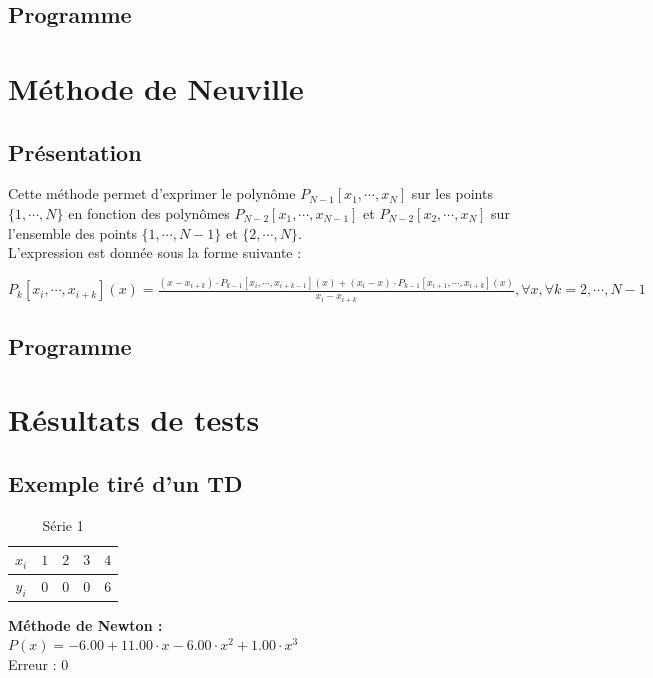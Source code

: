 \documentclass{report}
\begin{document}
      \subsection{Programme}
	
    \newpage
    \section{Méthode de Neuville}
      \subsection{Présentation}
	Cette méthode permet d'exprimer le polynôme $P_{N-1}[x_{1},\cdots,x_{N}]$ sur les points $\{1,\cdots,N\}$ en fonction des polynômes $P_{N-2}[x_{1},\cdots,x_{N-1}]$ et $P_{N-2}[x_{2},\cdots,x_{N}]$ sur l'ensemble des points $\{1,\cdots,N-1\}$ et $\{2,\cdots,N\}$.\\
	
	\noindent L'expression est donnée sous la forme suivante : 
	
	$P_{k}[x_{i},\cdots,x_{i+k}](x) = \frac{(x-x_{i+k}) \cdot P_{k-1}[x_{i},\cdots,x_{i+k-1}](x) + (x_{i}-x) \cdot P_{k-1}[x_{i+1},\cdots,x_{i+k}](x)}{x_{i}-x_{i+k}}, \forall x, \forall k=2,\cdots,N-1$ 
      \subsection{Programme}
	
    \newpage
    \section{Résultats de tests}
      \subsection{Exemple tiré d'un TD}
	\begin{table}[h]
	  \centering
	  \begin{tabular}{| c | c | c | c | c |}
	  \hline 
	  $x_{i}$ & $1$ & $2$ & $3$ & $4$ \\ 
	  \hline 
	  $y_{i}$ & $0$ & $0$ & $0$ & $6$ \\ 
	  \hline 
	  \end{tabular}
	  \caption{Série 1}
	  \label{inter_td3_ex3}
	\end{table}
	
	\noindent\textbf{Méthode de Newton :}\\
	$P(x)= -6.00 + 11.00 \cdot x- 6.00 \cdot x^{2}  + 1.00 \cdot x^{3} $\\
	Erreur : $0$
	\newline
	
\end{document}
